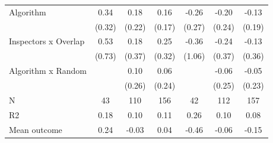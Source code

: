 \begin{tabular}{lccc|ccc}
Algorithm   &        0.34         &        0.18         &        0.16         &       -0.26         &       -0.20         &       -0.13         \\
            &      (0.32)         &      (0.22)         &      (0.17)         &      (0.27)         &      (0.24)         &      (0.19)         \\
\addlinespace
Inspectors x Overlap&        0.53         &        0.18         &        0.25         &       -0.36         &       -0.24         &       -0.13         \\
            &      (0.73)         &      (0.37)         &      (0.32)         &      (1.06)         &      (0.37)         &      (0.36)         \\
\addlinespace
Algorithm x Random&                     &        0.10         &        0.06         &                     &       -0.06         &       -0.05         \\
            &                     &      (0.26)         &      (0.24)         &                     &      (0.25)         &      (0.23)         \\
\midrule
N           &          43         &         110         &         156         &          42         &         112         &         157         \\
R2          &        0.18         &        0.10         &        0.11         &        0.26         &        0.10         &        0.08         \\
Mean outcome&        0.24         &       -0.03         &        0.04         &       -0.46         &       -0.06         &       -0.15         \\
\bottomrule \end{tabular}
